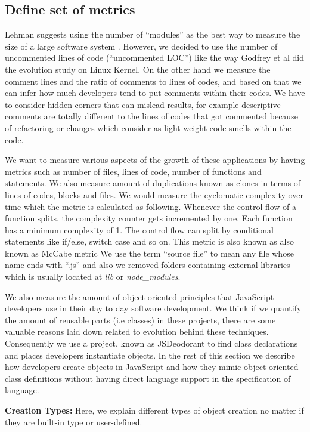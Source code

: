 \subsection{Define set of metrics}

Lehman suggests using the number of “modules” as the best way to measure the size of a large software system \cite{Lehman1997METRICS}. However, we decided to use the number of uncommented lines of code (“uncommented LOC”) like the way Godfrey et al \cite{Godfrey2000ICMS} did the evolution study on Linux Kernel. On the other hand we measure the comment lines and the ratio of comments to lines of codes, and based on that we can infer how much developers tend to put comments within their codes. We have to consider hidden corners that can mislead results, for example descriptive comments are totally different to the lines of codes that got commented because of refactoring or changes which consider as light-weight code smells within the code.

We want to measure various aspects of the growth of these applications by having metrics such as number of files, lines of code, number of functions and statements. We also measure amount of duplications known as clones in terms of lines of codes, blocks and files. We would measure the cyclomatic complexity over time which the metric is calculated as following. Whenever the control flow of a function splits, the complexity counter gets incremented by one. Each function has a minimum complexity of 1. The control flow can split by conditional statements like if/else, switch case and so on. This metric is also known as also known as McCabe metric
We use the term “source file” to mean any file whose name ends with “.js” and also we removed folders containing external libraries which is usually located at \textit{lib} or \textit{node\_modules}. 

We also measure the amount of object oriented principles that JavaScript developers use in their day to day software development. We think if we quantify the amount of reusable parts (i.e classes) in these projects, there are some valuable reasons laid down related to evolution behind these techniques. Consequently we use a project, known as JSDeodorant to find class declarations and places developers instantiate objects.
In the rest of this section we describe how developers create objects in JavaScript and how they mimic object oriented class definitions without having direct language support in the specification of language.

\noindent\textbf{Creation Types:} Here, we explain different types of object creation no matter if they are built-in type or user-defined. 

